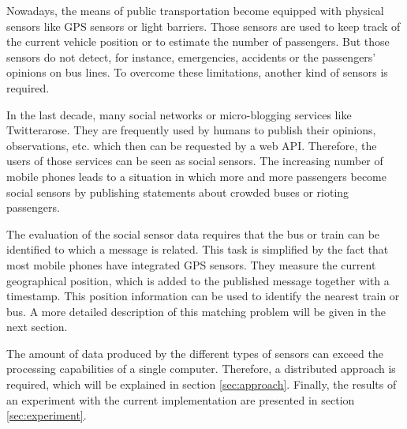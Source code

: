


Nowadays, the means of public transportation become equipped with physical sensors like GPS sensors or light barriers. Those sensors are used to keep track of the current vehicle position or to estimate the number of passengers. But those sensors do not detect, for instance, emergencies, accidents or the passengers' opinions on bus lines. To overcome these limitations, another kind of sensors is required.

In the last decade, many social networks or micro-blogging services like Twitter\texttrademark arose. They are frequently used by humans to publish their opinions, observations, etc. which then can be requested by a web API. Therefore, the users of those services can be seen as social sensors. The increasing number of mobile phones leads to a situation in which more and more passengers become social sensors by publishing statements about crowded buses or rioting passengers.

The evaluation of the social sensor data requires that the bus or train can be identified to which a message is related. This task is simplified by the fact that most mobile phones have integrated GPS sensors. They measure the current geographical position, which is added to the published message together with a timestamp. This position information can be used to identify the nearest train or bus. A more detailed description of this matching problem  will be given in the next section.

The amount of data produced by the different types of sensors can exceed the processing capabilities of a single computer. Therefore, a distributed approach is required, which will be explained in section \ref{sec:approach}. Finally, the results of an experiment with the current implementation are presented in section \ref{sec:experiment}.

